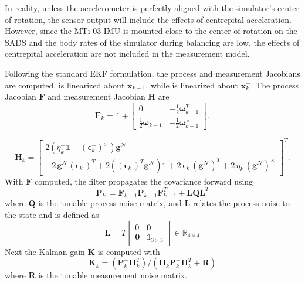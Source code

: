In reality, unless the accelerometer is perfectly aligned with the simulator's center of rotation, the sensor output will include the effects of centrepital acceleration. However, since the MTi-03 IMU is mounted close to the center of rotation on the SADS and the body rates of the simulator during balancing are low, the effects of centrepital acceleration are not included in the measurement model.

Following the standard EKF formulation, the process and measurement Jacobians are computed.  is linearized about $\bm{x}_{k-1}$, while  is linearized about $\bm{x}_k^-$. The process Jacobian $\bm{F}$ and measurement Jacobian $\bm{H}$ are 
\begin{equation}
    \bm{F}_k = \mathbb{1}+
\begin{bmatrix}
0 & -\tfrac{1}{2}\bm{\omega}_{k-1}^{T}\\[3pt]
\tfrac{1}{2}\bm{\omega}_{k-1} & -\tfrac{1}{2}\bm{\omega}_{k-1}^{\times}
\end{bmatrix}.
\end{equation}

\begin{equation}
\bm{H}_k =
\begin{bmatrix}
2\!\left(\eta_k^- \mathbb{1} - (\bm{\epsilon}_k^-)^{\times}\right)\bm{g}^{\mathcal N}
\\
-2\,\bm{g}^{\mathcal N}(\bm{\epsilon}_k^-)^{\!T}
+2\!\left((\bm{\epsilon}_k^-)^{\!T}\bm{g}^{\mathcal N}\right)\mathbb{1}
+2\,\bm{\epsilon}_k^- (\bm{g}^{\mathcal N})^{\!T}
+2\,\eta_k^- (\bm{g}^{\mathcal N})^{\times}
\end{bmatrix}^T.
\end{equation}
With $\bm{F}$ computed, the filter propagates the covariance forward using
\begin{equation}
        \bm{P}_k^- = \bm{F}_{k-1}\bm{P}_{k-1}\bm{F}_{k-1}^T + \bm{L}\bm{Q}\bm{L}^T
\end{equation}
where $\bm{Q}$ is the tunable process noise matrix, and $\bm{L}$ relates the process noise to the state and is defined as
\begin{equation}
    \bm{L} = T\begin{bmatrix}
        0      & \bm{0} \\
        \bm{0} & \mathbb{1}_{3\times3}
    \end{bmatrix}\in\mathbb{R}_{4\times4}
\end{equation}
Next the Kalman gain $\bm{K}$ is computed with
\begin{equation}
    \bm{K}_k = (\bm{P}_k^-\bm{H}_k^T)/(\bm{H}_k\bm{P}_k^-\bm{H}_k^T + \bm{R})
\end{equation}
where $\bm{R}$ is the tunable measurement noise matrix.

